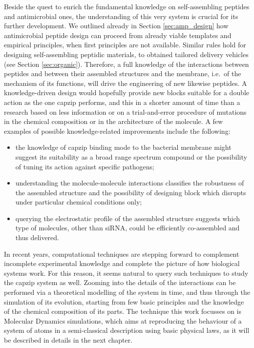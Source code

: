 Beside the quest to enrich the fundamental knowledge on self-assembling peptides and antimicrobial ones, the understanding of this very system is crucial for its further development. We outlined already in Section \ref{sec:amp_design} how antimicrobial peptide design can proceed from already viable templates and empirical principles, when first principles are not available. Similar rules hold for designing self-assembling peptidic materials, to obtained tailored delivery vehicles (see Section \ref{sec:organic}).
%
Therefore, a full knowledge of the interactions between peptides and between their assembled structures and the membrane, i.e.\ of the mechanism of its functions, will drive the engineering of new likewise peptides. A knowledge-driven design would hopefully provide new blocks suitable for a double action as the one capzip performs, and this in a shorter amount of time than a research based on less information or on a trial-and-error procedure of mutations in the chemical composition or in the architecture of the molecule. A few examples of possible knowledge-related improvements include the following:
\begin{itemize}
\item the knowledge of capzip binding mode to the bacterial membrane might suggest its suitability as a broad range spectrum compound or the possibility of tuning its action against specific pathogens;
\item understanding the molecule-molecule interactions classifies the robustness of the assembled structure and the possibility of designing block which disrupts under particular chemical conditions only;
\item querying the electrostatic profile of the assembled structure suggests which type of molecules, other than siRNA, could be efficiently co-assembled and thus delivered.
\end{itemize}

In recent years, computational techniques are stepping forward to complement incomplete experimental knowledge and complete the picture of how biological systems work. For this reason, it seems natural to query such techniques to study the capzip system as well. Zooming into the details of the interactions can be performed via a theoretical modelling of the system in time, and thus through the simulation of its evolution, starting from few basic principles and the knowledge of the chemical composition of its parts. The technique this work focusses on is Molecular Dynamics simulations, which aims at reproducing the behaviour of a system of atoms in a semi-classical description using basic physical laws, as it will be described in details in the next chapter.

